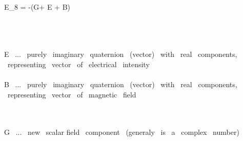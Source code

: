 \widehat E_8 = -(G+\imath {} \widehat E + \widehat B)

\\\\\\

\widehat E \ ... \ purely \ imaginary \ quaternion \ (vector) \ with  \ real \ components, \ representing \ vector \ of \ electrical \ intensity
\\\\
\widehat B \ ... \  purely \ imaginary \ quaternion \ (vector) \ with  \ real \ components, \ representing \ vector \ of \ magnetic \ field

\\\\
G \ ... \ new \ scalar field \ component \ (generaly \ is \ a \ complex \ number)
\\\\
